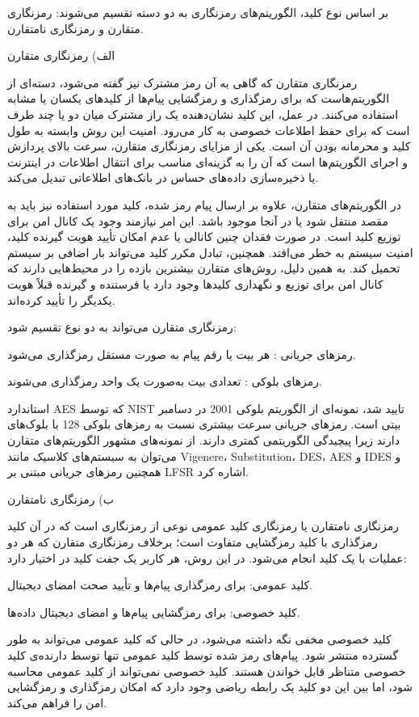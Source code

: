 بر اساس نوع کلید، الگوریتم‌های رمزنگاری به دو دسته تقسیم می‌شوند: رمزنگاری متقارن و رمزنگاری نامتقارن\cite{ref25}.

الف) رمزنگاری متقارن

رمزنگاری متقارن که گاهی به آن رمز مشترک نیز گفته می‌شود، دسته‌ای از الگوریتم‌هاست که برای رمزگذاری و رمزگشایی پیام‌ها از کلیدهای یکسان یا مشابه استفاده می‌کنند. در عمل، این کلید نشان‌دهنده یک راز مشترک میان دو یا چند طرف است که برای حفظ اطلاعات خصوصی به کار می‌رود. امنیت این روش وابسته به طول کلید و محرمانه بودن آن است. یکی از مزایای رمزنگاری متقارن، سرعت بالای پردازش و اجرای الگوریتم‌ها است که آن را به گزینه‌ای مناسب برای انتقال اطلاعات در اینترنت یا ذخیره‌سازی داده‌های حساس در بانک‌های اطلاعاتی تبدیل می‌کند\cite{ref26}.

در الگوریتم‌های متقارن، علاوه بر ارسال پیام رمز شده، کلید مورد استفاده نیز باید به مقصد منتقل شود یا در آنجا موجود باشد. این امر نیازمند وجود یک کانال امن برای توزیع کلید است. در صورت فقدان چنین کانالی یا عدم امکان تأیید هویت گیرنده کلید، امنیت سیستم به خطر می‌افتد. همچنین، تبادل مکرر کلید می‌تواند بار اضافی بر سیستم تحمیل کند. به همین دلیل، روش‌های متقارن بیشترین بازده را در محیط‌هایی دارند که کانال امن برای توزیع و نگهداری کلیدها وجود دارد یا فرستنده و گیرنده قبلاً هویت یکدیگر را تأیید کرده‌اند.

رمزنگاری متقارن می‌تواند به دو نوع تقسیم شود:

رمزهای جریانی : هر بیت یا رقم پیام به صورت مستقل رمزگذاری می‌شود.

رمزهای بلوکی : تعدادی بیت به‌صورت یک واحد رمزگذاری می‌شوند.

استاندارد ‎AES‎ که توسط ‎NIST‎ در دسامبر ‎2001‎ تایید شد، نمونه‌ای از الگوریتم بلوکی با بلوک‌های ‎128‎ بیتی است. رمزهای جریانی سرعت بیشتری نسبت به رمزهای بلوکی دارند زیرا پیچیدگی الگوریتمی کمتری دارند. از نمونه‌های مشهور الگوریتم‌های متقارن می‌توان به سیستم‌های کلاسیک مانند ‎Vigenere‎، ‎Substitution‎، ‎DES‎، ‎AES‎ و ‎IDES‎ و همچنین رمزهای جریانی مبتنی بر ‎LFSR‎ اشاره کرد\cite{ref25, ref27}.

ب) رمزنگاری نامتقارن

رمزنگاری نامتقارن یا رمزنگاری کلید عمومی نوعی از رمزنگاری است که در آن کلید رمزگذاری با کلید رمزگشایی متفاوت است؛ برخلاف رمزنگاری متقارن که هر دو عملیات با یک کلید انجام می‌شود. در این روش، هر کاربر یک جفت کلید در اختیار دارد:

کلید عمومی: برای رمزگذاری پیام‌ها و تأیید صحت امضای دیجیتال.

کلید خصوصی: برای رمزگشایی پیام‌ها و امضای دیجیتال داده‌ها.

کلید خصوصی مخفی نگه داشته می‌شود، در حالی که کلید عمومی می‌تواند به طور گسترده منتشر شود. پیام‌های رمز شده توسط کلید عمومی تنها توسط دارنده‌ی کلید خصوصی متناظر قابل خواندن هستند. کلید خصوصی نمی‌تواند از کلید عمومی محاسبه شود، اما بین این دو کلید یک رابطه ریاضی وجود دارد که امکان رمزگذاری و رمزگشایی امن را فراهم می‌کند.

